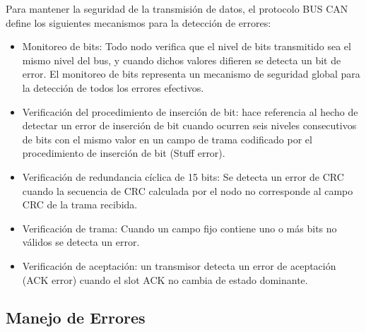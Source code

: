 Para mantener la seguridad de la transmisión de datos, el protocolo BUS CAN define los siguientes mecanismos para la detección de errores: 
\begin{itemize}
\item Monitoreo de bits: Todo nodo verifica que el nivel de bits transmitido sea el mismo nivel del bus, y cuando dichos valores difieren se detecta un bit de error. El monitoreo de bits representa un mecanismo de seguridad global para la detección de todos los errores efectivos.
\item Verificación del procedimiento de inserción de bit: hace referencia al hecho de detectar un error de inserción de bit cuando ocurren seis niveles consecutivos de bits con el mismo valor en un campo de trama codificado por el procedimiento de inserción de bit (Stuff error).
\item Verificación de redundancia cíclica de 15 bits: Se detecta un error de CRC cuando la secuencia de CRC calculada por el nodo no corresponde al campo CRC de la trama recibida.
\item Verificación de trama: Cuando un campo fijo contiene uno o más bits no válidos se detecta un error. 
\item Verificación de aceptación: un transmisor detecta un error de aceptación (ACK error) cuando el slot ACK no cambia de estado dominante.
\end{itemize}


\subsection{Manejo de Errores}

